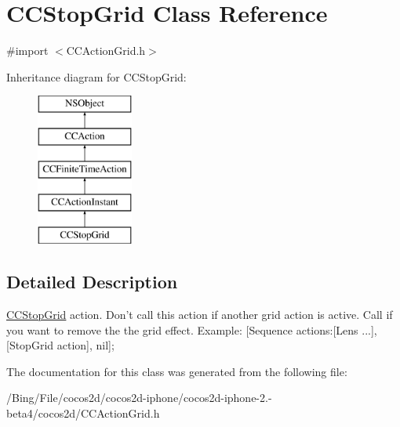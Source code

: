 \hypertarget{interface_c_c_stop_grid}{\section{C\-C\-Stop\-Grid Class Reference}
\label{interface_c_c_stop_grid}
}


{\ttfamily \#import $<$C\-C\-Action\-Grid.\-h$>$}

Inheritance diagram for C\-C\-Stop\-Grid\-:\begin{figure}[H]
\begin{center}
\leavevmode
\includegraphics[height=5.000000cm]{interface_c_c_stop_grid}
\end{center}
\end{figure}


\subsection{Detailed Description}
\hyperlink{interface_c_c_stop_grid}{C\-C\-Stop\-Grid} action. Don't call this action if another grid action is active. Call if you want to remove the the grid effect. Example\-: \mbox{[}Sequence actions\-:\mbox{[}Lens ...\mbox{]}, \mbox{[}Stop\-Grid action\mbox{]}, nil\mbox{]}; 

The documentation for this class was generated from the following file\-:\begin{DoxyCompactItemize}
\item 
/\-Bing/\-File/cocos2d/cocos2d-\/iphone/cocos2d-\/iphone-\/2.-\/beta4/cocos2d/C\-C\-Action\-Grid.\-h\end{DoxyCompactItemize}
